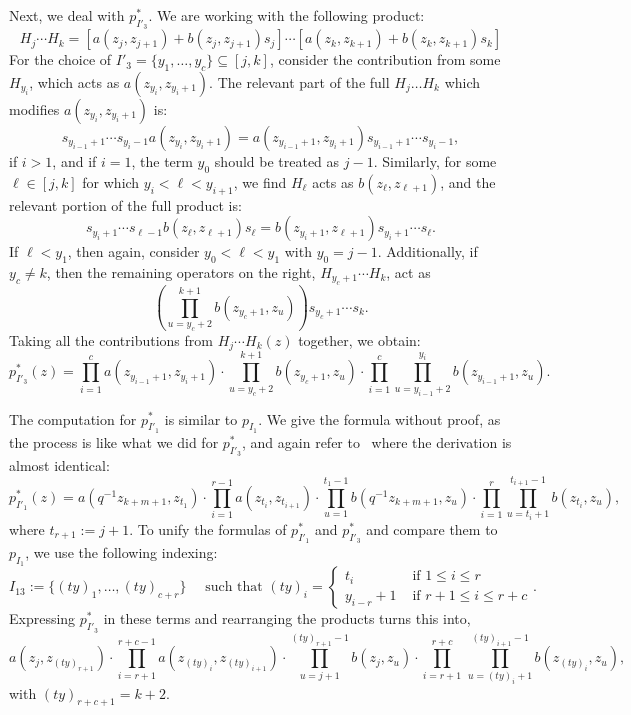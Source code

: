 \documentclass[ALCO]{cedram}
\newcommand{\pstarone}{p^*_{I'_1}}
\newcommand{\pstarthree}{p^*_{I'_3}}
\begin{document}
Next, we deal with $\pstarthree$. 
We are working with the following product:
\[ H_{j}\dotsm H_k = [a(z_j,z_{j+1})+b(z_j,z_{j+1}) s_j] \dotsm [a(z_{k},z_{k+1})+b(z_{k},z_{k+1}) s_{k}] \]
For the choice of $I'_3 = \{y_1, \dotsc, y_c \} \subseteq [j,k]$, consider the contribution from some $H_{y_i}$, which acts as $a(z_{y_i},z_{y_i+1})$. The relevant part of the full $H_j\dots H_k$ which modifies $a(z_{y_i},z_{y_i+1})$ is:
\[ s_{y_{i-1}+1} \dotsm s_{y_i-1} a(z_{y_i},z_{y_i+1}) = a(z_{y_{i-1}+1},z_{y_i+1}) s_{y_{i-1}+1} \dotsm s_{y_i-1},\]
if $i>1$, and if $i=1$, the term $y_0$ should be treated as $j-1$. Similarly, for some $\ell \in [j,k]$ for which $y_i < \ell < y_{i+1}$, we find $H_\ell$ acts as $b(z_\ell,z_{\ell+1})$, and the relevant portion of the full product is:
\[ s_{y_i+1}\dotsm s_{\ell-1} b(z_\ell,z_{\ell+1}) s_\ell = b(z_{y_i+1},z_{\ell+1}) s_{y_i+1}\dotsm s_\ell.\]
If $\ell<y_1$, then again, consider $y_0 < \ell < y_1$ with $y_0=j-1$. Additionally, if $y_c \neq k$, then the remaining operators on the right, $H_{y_c+1} \dotsm H_{k}$, act as
\[\left(\prod_{u=y_c+2}^{k+1} b(z_{y_c+1},z_u)\right) s_{y_c+1} \dotsm s_k. \]
Taking all the contributions from $H_j\dotsm H_k(z)$ together, we obtain:
\[ \pstarthree(z) = \prod_{i=1}^c a\left(z_{y_{i-1}+1},z_{y_i+1}\right) \cdot  \prod_{u=y_c+2}^{k+1} b(z_{y_c+1},z_u) \cdot  \prod_{i=1}^c \prod_{u=y_{i-1}+2}^{y_i} b\left(z_{y_{i-1}+1},z_u \right).\]




The computation for $\pstarone$ is similar to $p_{I_1}$. We give the formula without proof, as the process is like what we did for $\pstarthree$, and again refer to~\cite{MR2525842} where the derivation is almost identical:
\[ \pstarone(z) = a(q^{-1} z_{k+m+1},z_{t_1}) \cdot \prod_{i=1}^{r-1} a(z_{t_i},z_{t_{i+1}}) \cdot \prod_{u=1}^{t_1-1} b(q^{-1} z_{k+m+1},z_u) \cdot \prod_{i=1}^r \prod_{u=t_i+1}^{t_{i+1}-1} b(z_{t_i},z_u),\]
where $t_{r+1}:=j+1$. To unify the formulas of $\pstarone$ and $\pstarthree$ and compare them to $p_{I_1}$, we use the following indexing:
\[ I_{13} := \{(ty)_1, \dotsc, (ty)_{c+r}\} \quad \text{ such that } (ty)_i = \begin{cases} t_i & \text{ if } 1\leq i \leq r\\
y_{i-r}+1 &\text{ if } r+1 \leq i \leq r+c\end{cases}.\]
Expressing $\pstarthree$ in these terms and rearranging the products turns this into,
\[a(z_{j},z_{(ty)_{r+1}})\cdot \prod_{i=r+1}^{r+c-1} a\left(z_{(ty)_{i}},z_{(ty)_{i+1}}\right)  \cdot \prod_{u=j+1}^{(ty)_{r+1}-1} b(z_j,z_u) \cdot  \prod_{i=r+1}^{r+c}\, \prod_{u=(ty)_{i}+1}^{(ty)_{i+1}-1} b\left(z_{(ty)_i},z_u \right),\]
with $(ty)_{r+c+1}=k+2$.
\end{document}
